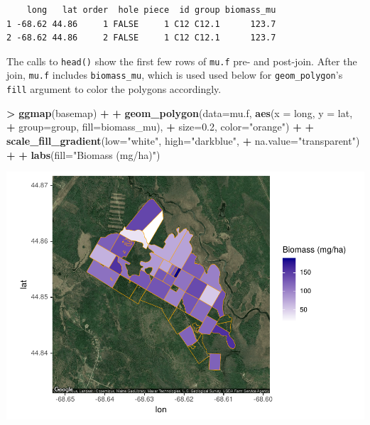 \documentclass[
]{krantz}
\makeatletter
\newenvironment{Shaded}{\begin{snugshade}}{\end{snugshade}}
\newcommand{\DataTypeTok}[1]{\textcolor[rgb]{0.27,0.27,0.27}{#1}}
\newcommand{\FloatTok}[1]{\textcolor[rgb]{0.06,0.06,0.06}{#1}}
\newcommand{\KeywordTok}[1]{\textcolor[rgb]{0.27,0.27,0.27}{\textbf{#1}}}
\newcommand{\NormalTok}[1]{#1}
\newcommand{\OperatorTok}[1]{\textcolor[rgb]{0.43,0.43,0.43}{\textbf{#1}}}
\newcommand{\StringTok}[1]{\textcolor[rgb]{0.5,0.5,0.5}{#1}}
\newenvironment{kframe}{%
\medskip{}
\setlength{\fboxsep}{.8em}
 \def\at@end@of@kframe{}%
 \ifinner\ifhmode%
  \def\at@end@of@kframe{\end{minipage}}%
  \begin{minipage}{\columnwidth}%
 \fi\fi%
 \def\FrameCommand##1{\hskip\@totalleftmargin \hskip-\fboxsep
 \colorbox{shadecolor}{##1}\hskip-\fboxsep
     \hskip-\linewidth \hskip-\@totalleftmargin \hskip\columnwidth}%
 \MakeFramed {\advance\hsize-\width
   \@totalleftmargin\z@ \linewidth\hsize
   \@setminipage}}%
 {\par\unskip\endMakeFramed%
 \at@end@of@kframe}
\renewenvironment{Shaded}{\begin{kframe}}{\end{kframe}}
\makeatother
\begin{document}
\begin{verbatim}
    long   lat order  hole piece  id group biomass_mu
1 -68.62 44.86     1 FALSE     1 C12 C12.1      123.7
2 -68.62 44.86     2 FALSE     1 C12 C12.1      123.7
\end{verbatim}

The calls to \texttt{head()} show the first few rows of \texttt{mu.f} pre- and post-join. After the join, \texttt{mu.f} includes \texttt{biomass\_mu}, which is used used below for \texttt{geom\_polygon}'s \texttt{fill} argument to color the polygons accordingly.

\begin{Shaded}
\begin{Highlighting}[]
\OperatorTok{\textgreater{}}\StringTok{ }\KeywordTok{ggmap}\NormalTok{(basemap) }\OperatorTok{+}
\OperatorTok{+}\StringTok{     }\KeywordTok{geom\_polygon}\NormalTok{(}\DataTypeTok{data=}\NormalTok{mu.f, }\KeywordTok{aes}\NormalTok{(}\DataTypeTok{x =}\NormalTok{ long, }\DataTypeTok{y =}\NormalTok{ lat, }
\OperatorTok{+}\StringTok{                                 }\DataTypeTok{group=}\NormalTok{group, }\DataTypeTok{fill=}\NormalTok{biomass\_mu), }
\OperatorTok{+}\StringTok{                  }\DataTypeTok{size=}\FloatTok{0.2}\NormalTok{, }\DataTypeTok{color=}\StringTok{"orange"}\NormalTok{) }\OperatorTok{+}
\OperatorTok{+}\StringTok{     }\KeywordTok{scale\_fill\_gradient}\NormalTok{(}\DataTypeTok{low=}\StringTok{"white"}\NormalTok{, }\DataTypeTok{high=}\StringTok{"darkblue"}\NormalTok{, }
\OperatorTok{+}\StringTok{                         }\DataTypeTok{na.value=}\StringTok{"transparent"}\NormalTok{) }\OperatorTok{+}
\OperatorTok{+}\StringTok{     }\KeywordTok{labs}\NormalTok{(}\DataTypeTok{fill=}\StringTok{"Biomass (mg/ha)"}\NormalTok{)}
\end{Highlighting}
\end{Shaded}

\includegraphics{bookdown_files/figure-latex/unnamed-chunk-208-1.pdf}
\end{document}
